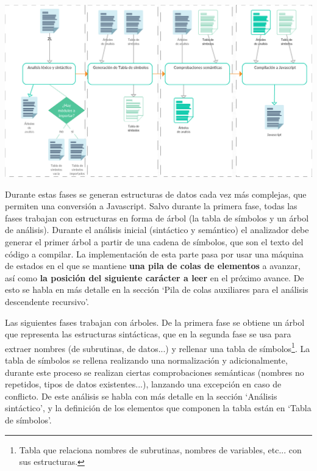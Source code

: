 \documentclass{report}
\begin{document}
\begin{center}
\includegraphics[width=1\linewidth]{fasesanalisis}
\end{center}
	
	\vspace{10px}
	
	Durante estas fases se generan estructuras de datos cada vez más complejas, que permiten una conversión a Javascript. Salvo durante la primera fase, todas las fases trabajan con estructuras en forma de árbol (la tabla de símbolos y un árbol de análisis). Durante el análisis inicial (sintáctico y semántico) el analizador debe generar el primer árbol a partir de una cadena de símbolos, que son el texto del código a compilar. La implementación de esta parte pasa por usar una máquina de estados en el que se mantiene \textbf{una pila de colas de elementos} a avanzar, así como \textbf{la posición del siguiente carácter a leer} en el próximo avance. De esto se habla en más detalle en la sección `Pila de colas auxiliares para el análisis descendente recursivo'. 
	
	\vspace{10px}
	
	Las siguientes fases trabajan con árboles. De la primera fase se obtiene un árbol que representa las estructuras sintácticas, que en la segunda fase se usa para extraer nombres (de subrutinas, de datos...) y rellenar una tabla de símbolos\footnote{Tabla que relaciona nombres de subrutinas, nombres de variables, etc... con sus estructuras.}. La tabla de símbolos se rellena realizando una normalización y adicionalmente, durante este proceso se realizan ciertas comprobaciones semánticas (nombres no repetidos, tipos de datos existentes...), lanzando una excepción en caso de conflicto. De este análisis se habla con más detalle en la sección `Análisis sintáctico', y la definición de los elementos que componen la tabla están en `Tabla de símbolos'.
	
\end{document}

